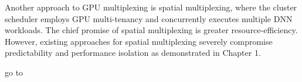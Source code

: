 Another approach to GPU multiplexing is spatial multiplexing, where the cluster scheduler employs GPU multi-tenancy and concurrently executes multiple DNN workloads. The chief promise of spatial multiplexing is greater resource-efficiency. However, existing approaches for spatial multiplexing severely compromise predictability and performance isolation as demonstrated in Chapter 1. 

go to

